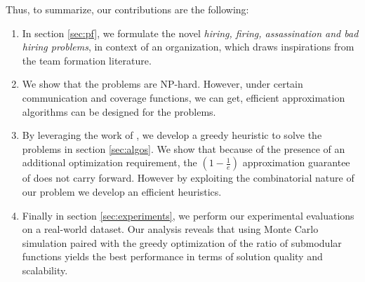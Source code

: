 Thus, to summarize, our contributions are the following:

\begin{enumerate}
\item In section \ref{sec:pf}, we formulate the novel \textit{hiring, firing, assassination and bad hiring problems}, in context of an organization, which draws inspirations from the team formation literature.

\item We show that the problems are NP-hard. However, under certain communication and coverage functions, we can get, efficient approximation algorithms can be designed for the problems.

\item By leveraging the work of \cite{bai2016algorithms}, we develop a greedy heuristic to solve the problems in section \ref{sec:algos}. We show that because of the presence of an additional optimization requirement, the $(1 - \frac{1}{e})$ approximation guarantee of \cite{bai2016algorithms} does not carry forward. However by exploiting the combinatorial nature of our problem we develop an efficient heuristics.

\item Finally in section \ref{sec:experiments}, we perform our experimental evaluations on a real-world dataset. Our analysis reveals that using Monte Carlo simulation paired with the greedy optimization of the ratio of submodular functions yields the best performance in terms of solution quality and scalability.

\end{enumerate}